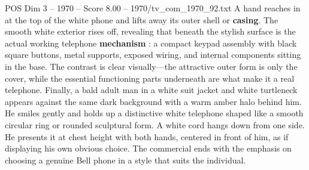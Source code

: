 \begin{textsample}{POS Dim 3 – 1970 – Score 8.00 – 1970/tv\_com\_1970\_92.txt}
A hand reaches in at the top of the white phone and lifts away its outer shell or \textbf{casing}.
The smooth white exterior rises off, revealing that beneath the stylish surface is the actual working telephone \textbf{mechanism} : a compact keypad assembly with black square buttons, metal supports, exposed wiring, and internal components sitting in the base.
The contrast is clear visually—the attractive outer form is only the cover, while the essential functioning parts underneath are what make it a real telephone.
Finally, a bald adult man in a white suit jacket and white turtleneck appears against the same dark background with a warm amber halo behind him.
He smiles gently and holds up a distinctive white telephone shaped like a smooth circular ring or rounded sculptural form.
A white cord hangs down from one side.
He presents it at chest height with both hands, centered in front of him, as if displaying his own obvious choice.
The commercial ends with the emphasis on choosing a genuine Bell phone in a style that suits the individual.

\end{textsample}
